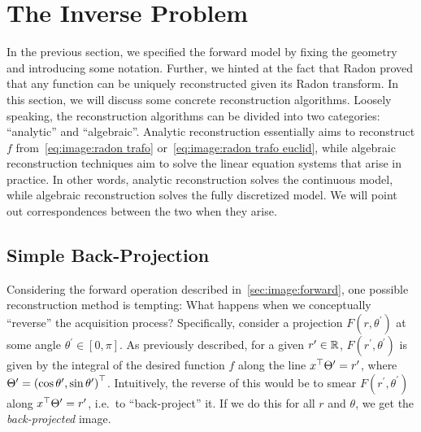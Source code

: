 \documentclass[../ml-ct.tex]{subfiles}
\begin{document}
\section{The Inverse Problem}
In the previous section, we specified the forward model by fixing the geometry and introducing some notation.
Further, we hinted at the fact that Radon proved that any function can be uniquely reconstructed given its Radon transform.
In this section, we will discuss some concrete reconstruction algorithms.
Loosely speaking, the reconstruction algorithms can be divided into two categories: \enquote{analytic} and \enquote{algebraic}.
Analytic reconstruction essentially aims to reconstruct \( f \) from~\cref{eq:image:radon trafo} or~\cref{eq:image:radon trafo euclid}, while algebraic reconstruction techniques aim to solve the linear equation systems that arise in practice.
In other words, analytic reconstruction solves the continuous model, while algebraic reconstruction solves the fully discretized model.
We will point out correspondences between the two when they arise.
\subsection{Simple Back-Projection}%
\label{ssec:image:sbp}
Considering the forward operation described in~\cref{sec:image:forward}, one possible reconstruction method is tempting:
What happens when we conceptually \enquote{reverse} the acquisition process?
Specifically, consider a projection \( F(r, \theta^\prime) \) at some angle \( \theta^\prime \in [0,\pi] \).
As previously described, for a given \( r^\prime \in \mathbb{R} \), \( F(r^\prime, \theta^\prime) \) is given by the integral of the desired function \( f \) along the line \( x^\top\Theta^\prime = r^\prime \), where \( \Theta^\prime = {(\cos\theta^\prime, \sin\theta^\prime)}^\top \).
Intuitively, the reverse of this would be to smear \( F(r^\prime, \theta^\prime) \) along \( x^\top\Theta^\prime = r^\prime \), i.e.\ to \enquote{back-project} it.
If we do this for all \( r \) and \( \theta \), we get the \emph{back-projected} image.
\end{document}
